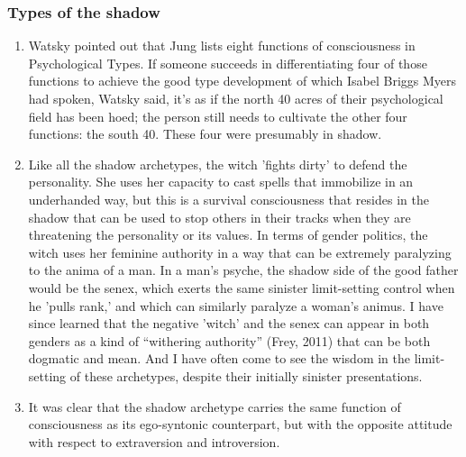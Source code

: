 \subsubsection{Types of the shadow}

\begin{enumerate}

    \item {}
        Watsky pointed out that Jung lists eight functions of consciousness in
        Psychological Types. If someone succeeds in differentiating four of
        those functions to achieve the good type development of which Isabel
        Briggs Myers had spoken, Watsky said, it's as if the north 40 acres of
        their psychological field has been hoed; the person still needs to
        cultivate the other four functions: the south 40. These four were
        presumably in shadow.

    \item {} Like all the shadow archetypes, the witch
        'fights dirty' to defend the personality. She uses her capacity to cast
        spells that immobilize in an underhanded way, but this is a survival
        consciousness that resides in the shadow that can be used to stop
        others in their tracks when they are threatening the personality or its
        values. In terms of gender politics, the witch uses her feminine
        authority in a way that can be extremely paralyzing to the anima of a
        man. In a man's psyche, the shadow side of the good father would be the
        senex, which exerts the same sinister limit-setting control when he
        'pulls rank,' and which can similarly paralyze a woman's animus. I have
        since learned that the negative 'witch' and the senex can appear in
        both genders as a kind of ``withering authority'' (Frey, 2011) that can
        be both dogmatic and mean. And I have often come to see the wisdom in
        the limit-setting of these archetypes, despite their initially sinister
        presentations.

    \item {} It was clear
        that the shadow archetype carries the same function of consciousness as
        its ego-syntonic counterpart, but with the opposite attitude with
        respect to extraversion and introversion.


\end{enumerate}
